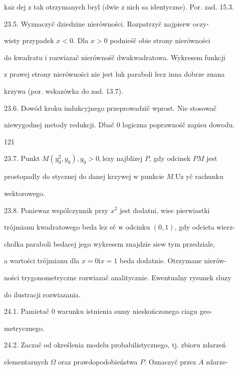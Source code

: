 \documentclass[a4paper,12pt]{article}
\begin{document}
$\mathrm{k}\mathrm{a}\dot{\mathrm{z}}$ dej $\mathrm{z}$ tak otrzymanych bryl (dwie $\mathrm{z}$ nich sa identyczne). Por. $\mathrm{z}\mathrm{a}\mathrm{d}$. 15.3.

23.5. Wyznaczyč dziedzine nierówności. Rozpatrzyč najpierw oczy-

wisty przypadek $x < 0$. Dla $x > 0$ podnieśč obie strony nierówności

do kwadratu $\mathrm{i}$ rozwiazač nierównośč dwukwadratowa. Wykresem funkcji

$\mathrm{z}$ prawej strony nierówności nie jest luk paraboli lecz inna dobrze znana

krzywa (por. wskazówka do $\mathrm{z}\mathrm{a}\mathrm{d}$. 13.7).

23.6. Dowód kroku indukcyjnego przeprowadzič wprost. Nie stosowač

niewygodnej metody redukcji. Dbač $0$ logiczna poprawnośč zapisu dowodu.





121

23.7. Punkt $M(y_{0}^{2},y_{0}), y_{0}>0, \mathrm{l}\mathrm{e}\dot{\mathrm{z}}\mathrm{y}$ najblizej $P$, gdy odcinek $PM$ jest

prostopadly do stycznej do danej krzywej $\mathrm{w}$ punkcie $M. \mathrm{U}\dot{\mathrm{z}}$ yč rachunku

wektorowego.

23.8. Poniewaz wspólczynnik przy $x^{2}$ jest dodatni, wiec pierwiastki

trójmianu kwadratowego beda $\mathrm{l}\mathrm{e}\dot{\mathrm{z}}$ eč $\mathrm{w}$ odcinku $(0,1)$, gdy odcieta wierz-

cholka paraboli bedacej jego wykresem znajdzie $\mathrm{s}\mathrm{i}\mathrm{e} \mathrm{w}$ tym przedziale,

a wartości trójmianu dla $x=0\mathrm{i}x=1$ beda dodatnie. Otrzymane nierów-

ności trygonometryczne rozwiazač analitycznie. Ewentualny rysunek sluzy

do ilustracji rozwiazania.

24.1. Pamietač 0 warunku istnienia sumy nieskończonego ciagu geo-

metrycznego.

24.2. Zaczač od określenia modelu probabilistycznego, $\mathrm{t}\mathrm{j}$. zbioru zdarzeń

elementarnych $\Omega$ oraz prawdopodobieństwa $P$. Oznaczyč przez $A$ zdarze-
\end{document}
